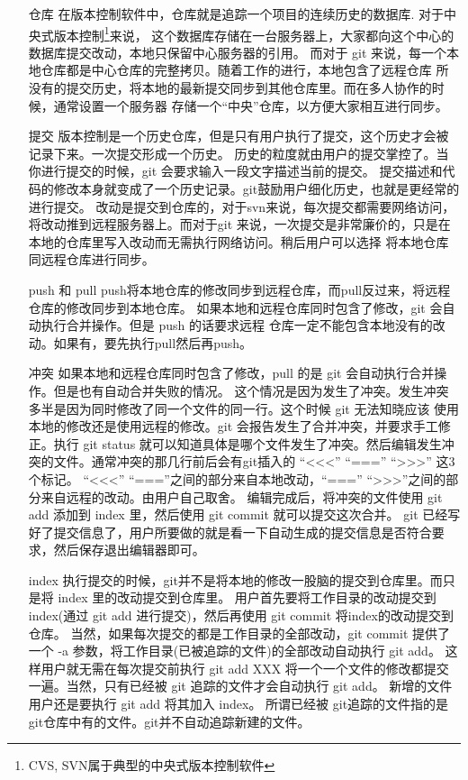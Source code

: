 \begin{enumerate}
\item[仓库] 在版本控制软件中，仓库就是追踪一个项目的连续历史的数据库. 对于中央式版本控制\footnote{CVS, SVN属于典型的中央式版本控制软件}来说，
			这个数据库存储在一台服务器上，大家都向这个中心的数据库提交改动，本地只保留中心服务器的引用。
			而对于 git 来说，每一个本地仓库都是中心仓库的完整拷贝。随着工作的进行，本地包含了远程仓库
			所没有的提交历史，将本地的最新提交同步到其他仓库里。而在多人协作的时候，通常设置一个服务器
			存储一个“中央”仓库，以方便大家相互进行同步。

\item[提交] 版本控制是一个历史仓库，但是只有用户执行了提交，这个历史才会被记录下来。一次提交形成一个历史。
			历史的粒度就由用户的提交掌控了。当你进行提交的时候，git 会要求输入一段文字描述当前的提交。
			提交描述和代码的修改本身就变成了一个历史记录。git鼓励用户细化历史，也就是更经常的进行提交。
			改动是提交到仓库的，对于svn来说，每次提交都需要网络访问，将改动推到远程服务器上。而对于git
			来说，一次提交是非常廉价的，只是在本地的仓库里写入改动而无需执行网络访问。稍后用户可以选择
			将本地仓库同远程仓库进行同步。

\item[push 和 pull]	push将本地仓库的修改同步到远程仓库，而pull反过来，将远程仓库的修改同步到本地仓库。
					如果本地和远程仓库同时包含了修改，git 会自动执行合并操作。但是 push 的话要求远程
					仓库一定不能包含本地没有的改动。如果有，要先执行pull然后再push。

\item[冲突]	如果本地和远程仓库同时包含了修改，pull 的是 git 会自动执行合并操作。但是也有自动合并失败的情况。
			这个情况是因为发生了冲突。发生冲突多半是因为同时修改了同一个文件的同一行。这个时候 git 无法知晓应该
			使用本地的修改还是使用远程的修改。git 会报告发生了合并冲突，并要求手工修正。执行 git status 
			就可以知道具体是哪个文件发生了冲突。然后编辑发生冲突的文件。通常冲突的那几行前后会有git插入的
			“<<<” “===” “>>>” 这3个标记。
			“<<<” “===”之间的部分来自本地改动，“===” “>>>”之间的部分来自远程的改动。由用户自己取舍。
			编辑完成后，将冲突的文件使用 git add 添加到 index 里，然后使用 git commit 就可以提交这次合并。
			git 已经写好了提交信息了，用户所要做的就是看一下自动生成的提交信息是否符合要求，然后保存退出编辑器即可。


\item [index]	执行提交的时候，git并不是将本地的修改一股脑的提交到仓库里。而只是将 index 里的改动提交到仓库里。
				用户首先要将工作目录的改动提交到index(通过 git add 进行提交)，然后再使用 git commit 将index的改动提交到仓库。
				当然，如果每次提交的都是工作目录的全部改动，git commit 提供了一个 -a 参数，将工作目录(已被追踪的文件)的全部改动自动执行 git add。
				这样用户就无需在每次提交前执行 git add XXX 将一个一个文件的修改都提交一遍。当然，只有已经被 git 追踪的文件才会自动执行 git add。 
				新增的文件用户还是要执行 git add 将其加入 index。 所谓已经被 git追踪的文件指的是git仓库中有的文件。git并不自动追踪新建的文件。


\end{enumerate}
